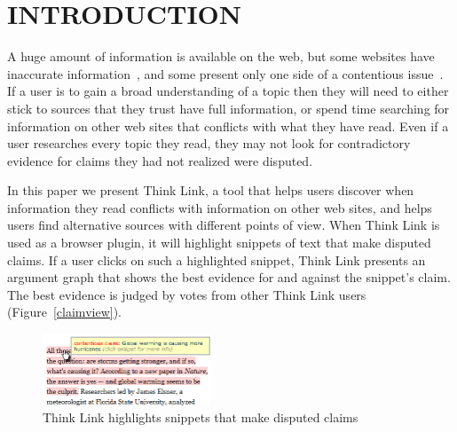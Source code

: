 \documentclass{chi2009}
\begin{document}





\section{INTRODUCTION}

A huge amount of information is available on the web, but some websites have inaccurate information~\cite{Mintz2002,Neumann2003,Resnik1998,Zhou2004}, and some present only one side of a contentious issue~\cite{Herman2002,Gentzkow2007}.  %
If a user is to gain a broad understanding of a topic then they will need to either stick to sources that they trust have full information, or spend time searching for information on other web sites that conflicts with what they have read.  %
Even if a user researches every topic they read, they may not look for contradictory evidence for claims they had not realized were disputed. %

In this paper we present Think Link, a tool that helps users discover when information they read conflicts with information on other web sites, and helps users find alternative sources with different points of view.  %
When Think Link is used as a browser plugin, it will highlight snippets of text that make disputed claims.  %
If a user clicks on such a highlighted snippet, Think Link presents an argument graph that shows the best evidence for and against the snippet's claim.  %
The best evidence is judged by votes from other Think Link users (Figure~\ref{claimview}).  %

\begin{figure}[tb]
	\begin{center}
	\includegraphics[width=5cm]{../screenshots/highlight_crop.png}
	\caption{Think Link highlights snippets that make disputed claims}
	\label{highlight}
	\end{center}
\end{figure}
\end{document}
